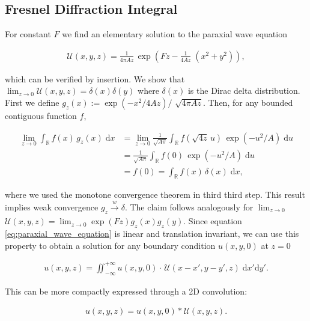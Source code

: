 
\subsection{Fresnel Diffraction Integral}

For constant $F$ we find an elementary solution to the paraxial wave equation

\begin{align*}
\mathcal{U}(x,y,z) = \frac{1}{4 \pi A z} \, \exp \! \left(F z-\frac{1}{4 A z} \; (x^2+y^2)\right),
\end{align*}

which can be verified by insertion. We show that $\lim_{z \rightarrow 0} \mathcal{U}(x,y,z) = \delta(x)\delta(y)$ where $\delta(x)$ is the Dirac delta distribution. First we define $g_z(x) := \exp(-x^2/4 A z) /$ $\sqrt{4 \pi A z}$. Then, for any bounded contiguous function $f$,

\begin{align*}
    \lim_{z \rightarrow 0} \int_\mathbb{R} f(x) \, g_z(x)  \; \text{d}x & = 
    \lim_{z \rightarrow 0} \frac{1}{\sqrt{A \pi}} \int_\mathbb{R} f(\sqrt{4 z} \, u) \, \exp(-u^2/A)  \; \text{d}u \\
    & =  \frac{1}{\sqrt{A \pi}} \int_\mathbb{R} f(0) \, \exp(-u^2/A)  \; \text{d}u \\
    & = f(0) = \int_\mathbb{R} f(x) \, \delta(x)  \; \text{d}x,
\end{align*}

where we used the monotone convergence theorem in third third step. This result implies weak convergence $g_z \! \xrightarrow[]{w} \! \delta$. The claim follows analogously for $\lim_{z \rightarrow 0} $ $ \mathcal{U}(x,y,z) = \lim_{z \rightarrow 0} \exp(Fz) g_z(x) g_z(y)$. Since equation \eqref{eq:paraxial_wave_equation} is linear and translation invariant, we can use this property to obtain a solution for any boundary condition $u(x,y,0)$ at $z = 0$

\begin{align*}
u(x,y,z) = \iint_{-\infty}^{+\infty} u(x,y,0) \cdot \, \mathcal{U}(x-x',y-y', z) \; \mathrm d x' \mathrm d y'.
\end{align*}

This can be more compactly expressed through a 2D convolution:

\begin{align} \label{eq:fresnel_convolution}
u(x,y,z) =  u(x,y,0) * \mathcal{U}(x,y,z).
\end{align}
